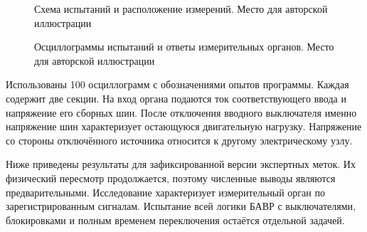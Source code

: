 \begin{figure}[htbp]
\centering
{}
\caption{Схема испытаний и расположение измерений. Место для авторской иллюстрации}
\label{fig:ch5_rtds_placeholder_network}
\end{figure}
\begin{figure}[htbp]
\centering
{}
\caption{Осциллограммы испытаний и ответы измерительных органов. Место для авторской иллюстрации}
\label{fig:ch5_rtds_placeholder_traces}
\end{figure}

Использованы 100 осциллограмм с обозначениями опытов программы.
Каждая содержит две секции.
На вход органа подаются ток соответствующего ввода
и напряжение его сборных шин.
После отключения вводного выключателя именно напряжение шин
характеризует остающуюся двигательную нагрузку.
Напряжение со стороны отключённого источника
относится к другому электрическому узлу.

Ниже приведены результаты для зафиксированной версии
экспертных меток. Их физический пересмотр продолжается,
поэтому численные выводы являются предварительными.
Исследование характеризует измерительный орган
по зарегистрированным сигналам.
Испытание всей логики БАВР с выключателями,
блокировками и полным временем переключения
остаётся отдельной задачей.


